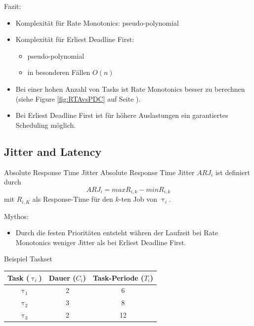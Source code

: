 \newpage
\begin{frame}{Fazit:}
	\begin{itemize}
		\item Komplexität für Rate Monotonics: pseudo-polynomial
		\item Komplexität für Erliest Deadline First:
		\begin{itemize}
			\item pseudo-polynomial
			\item in besonderen Fällen $O(n)$
		\end{itemize}
		\item Bei einer hohen Anzahl von Tasks ist Rate Monotonics besser zu berechnen (siehe Figure \ref{fig:RTAvsPDC} auf Seite \pageref{fig:RTAvsPDC}).
		\item Bei Erliest Deadline First ist für höhere Auslastungen ein garantiertes Scheduling möglich.
	\end{itemize}
\end{frame}



\subsection{Jitter and Latency}\label{JitterandLatency}

\begin{frame}{Absolute Response Time Jitter}
	Absolute Response Time Jitter $ARJ_i$ ist definiert durch
	\begin{equation}
		ARJ_i=max R_{i,k}-min R_{i,k}
	\end{equation} mit
	$R_{i,K}$ als Response-Time für den $k$-ten Job von $\uptau_i$.
\end{frame}

\begin{frame}{Mythos:}
	\begin{itemize}
		\item Durch die festen Prioritäten entsteht währen der Laufzeit bei Rate Monotonics weniger Jitter als bei Erliest Deadline First. 
	\end{itemize}
\end{frame}

\begin{frame}{Beispiel Taskset}
	\begin{center}
		\begin{tabular}{c||c|c}
			Task ($\uptau_i$) & Dauer ($C_i$) & Task-Periode ($T_i$)\\\hline\hline
			$\uptau_1$ & 2 & 6\\
			$\uptau_2$ & 3 & 8\\
			$\uptau_3$ & 2 & 12
		\end{tabular}	
	\end{center}
\end{frame}

